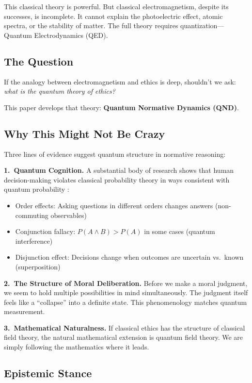 \documentclass[12pt]{article}
\begin{document}
This classical theory is powerful. But classical electromagnetism, despite its successes, is incomplete. It cannot explain the photoelectric effect, atomic spectra, or the stability of matter. The full theory requires quantization---Quantum Electrodynamics (QED).

\subsection{The Question}

If the analogy between electromagnetism and ethics is deep, shouldn't we ask: \emph{what is the quantum theory of ethics?}

This paper develops that theory: \textbf{Quantum Normative Dynamics (QND)}.

\subsection{Why This Might Not Be Crazy}

Three lines of evidence suggest quantum structure in normative reasoning:

\textbf{1.\ Quantum Cognition.} A substantial body of research shows that human decision-making violates classical probability theory in ways consistent with quantum probability \cite{busemeyer2012,pothos2013,bruza2015}:

\begin{itemize}
    \item Order effects: Asking questions in different orders changes answers (non-commuting observables)
    \item Conjunction fallacy: $P(A \wedge B) > P(A)$ in some cases (quantum interference)
    \item Disjunction effect: Decisions change when outcomes are uncertain vs.\ known (superposition)
\end{itemize}

\textbf{2.\ The Structure of Moral Deliberation.} Before we make a moral judgment, we seem to hold multiple possibilities in mind simultaneously. The judgment itself feels like a ``collapse'' into a definite state. This phenomenology matches quantum measurement.

\textbf{3.\ Mathematical Naturalness.} If classical ethics has the structure of classical field theory, the natural mathematical extension is quantum field theory. We are simply following the mathematics where it leads.

\subsection{Epistemic Stance}
\end{document}
